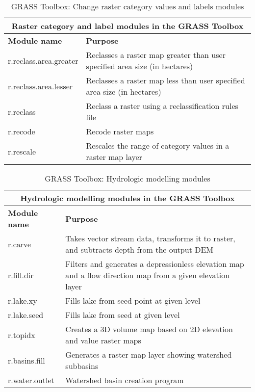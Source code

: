 \begin{table}[ht]
\centering
\caption{GRASS Toolbox: Change raster category values and labels modules}\medskip
 \begin{tabular}{|p{4cm}|p{12cm}|}
  \hline \multicolumn{2}{|c|}{\textbf{Raster category and label modules in the GRASS Toolbox}} \\
  \hline \textbf{Module name} & \textbf{Purpose} \\
  \hline r.reclass.area.greater & Reclasses a raster map greater than user
  specified area size (in hectares) \\
  \hline r.reclass.area.lesser & Reclasses a raster map less than user
  specified area size (in hectares) \\
  \hline r.reclass & Reclass a raster using a reclassification rules file \\
  \hline r.recode & Recode raster maps\\
  \hline r.rescale & Rescales the range of category values in a raster map
  layer \\
\hline
\end{tabular}
\end{table}

\begin{table}[ht]
\centering
\caption{GRASS Toolbox: Hydrologic modelling modules}\medskip
 \begin{tabular}{|p{4cm}|p{12cm}|}
  \hline \multicolumn{2}{|c|}{\textbf{Hydrologic modelling modules in the GRASS
  Toolbox}} \\
  \hline \textbf{Module name} & \textbf{Purpose} \\
  \hline r.carve & Takes vector stream data, transforms it to raster, and
  subtracts depth from the output DEM \\
  \hline r.fill.dir & Filters and generates a depressionless elevation map
  and a flow direction map from a given elevation layer \\
  \hline r.lake.xy & Fills lake from seed point at given level \\
  \hline r.lake.seed & Fills lake from seed at given level \\
  \hline r.topidx & Creates a 3D volume map based on 2D elevation and value
  raster maps \\
  \hline r.basins.fill & Generates a raster map layer showing watershed
  subbasins \\
  \hline r.water.outlet & Watershed basin creation program \\
\hline
\end{tabular}
\end{table}

